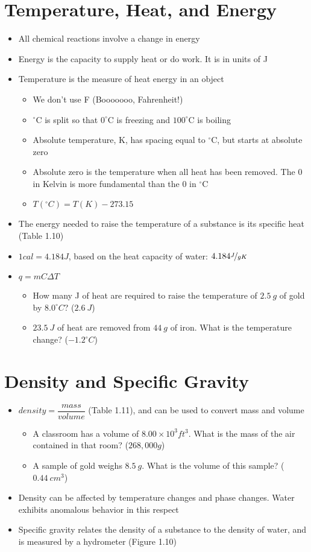 \documentclass[12pt, openany, letterpaper]{memoir}
\begin{document}
\section{Temperature, Heat, and Energy}
\begin{itemize}
	\item All chemical reactions involve a change in energy
	\item Energy is the capacity to supply heat or do work. It is in units of J
	\item Temperature is the measure of heat energy in an object
	\begin{itemize}
		\item We don't use F (Booooooo, Fahrenheit!)
		\item $^\circ$C is split so that $0^\circ$C is freezing and $100^\circ$C is boiling
		\item Absolute temperature, K, has spacing equal to $^\circ$C, but starts at absolute zero
		\item Absolute zero is the temperature when all heat has been removed. The $0$ in Kelvin is more fundamental than the $0$ in $^\circ$C
		\item $T( ^\circ C) = T(K)-273.15$
	\end{itemize}
	\item The energy needed to raise the temperature of a substance is its specific heat (Table 1.10)	
	\item $1cal=4.184J$, based on the heat capacity of water: $4.184\nicefrac{J}{gK}$
	\item $q=mC\Delta T$
    \begin{itemize}
      \item How many J of heat are required to raise the temperature of $2.5~g$ of gold by $8.0^\circ C$? ($2.6~J$)
      \item $23.5~J$ of heat are removed from $44~g$ of iron. What is the temperature change? ($-1.2^\circ C$)
    \end{itemize}
\end{itemize}

\section{Density and Specific Gravity}
\begin{itemize}
	\item $density=\dfrac{mass}{volume}$ (Table 1.11), and can be used to convert mass and volume 
  \begin{itemize}
    \item A classroom has a volume of $8.00\times 10^3ft^3$. What is the mass of the air contained in that room? ($268,000g$)
    \item A sample of gold weighs $8.5~g$. What is the volume of this sample? ($0.44~cm^3$)
  \end{itemize}
	\item Density can be affected by temperature changes and phase changes. Water exhibits anomalous behavior in this respect
	\item Specific gravity relates the density of a substance to the density of water, and is measured by a hydrometer (Figure 1.10)
\end{itemize}
\end{document}
